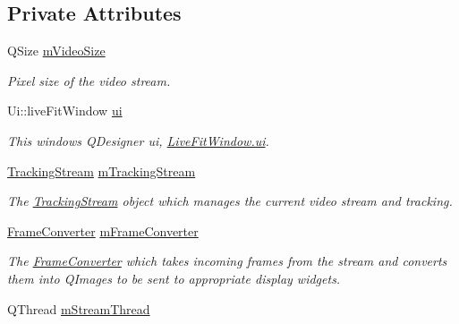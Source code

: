 \subsection*{Private Attributes}
\begin{DoxyCompactItemize}
\item 
Q\+Size \hyperlink{classLiveFitWindow_aaf25c0704549526c5312c29eb5db3feb}{m\+Video\+Size}\hypertarget{classLiveFitWindow_aaf25c0704549526c5312c29eb5db3feb}{}\label{classLiveFitWindow_aaf25c0704549526c5312c29eb5db3feb}

\begin{DoxyCompactList}\small\item\em Pixel size of the video stream. \end{DoxyCompactList}\item 
Ui\+::live\+Fit\+Window \hyperlink{classLiveFitWindow_a5e598fb19c7a2e513750052330843afc}{ui}\hypertarget{classLiveFitWindow_a5e598fb19c7a2e513750052330843afc}{}\label{classLiveFitWindow_a5e598fb19c7a2e513750052330843afc}

\begin{DoxyCompactList}\small\item\em This window\textquotesingle{}s Q\+Designer ui, \hyperlink{classLiveFitWindow_a5e598fb19c7a2e513750052330843afc}{Live\+Fit\+Window.\+ui}. \end{DoxyCompactList}\item 
\hyperlink{classTrackingStream}{Tracking\+Stream} \hyperlink{classLiveFitWindow_ab5bb92518073cbe806879092e322f165}{m\+Tracking\+Stream}\hypertarget{classLiveFitWindow_ab5bb92518073cbe806879092e322f165}{}\label{classLiveFitWindow_ab5bb92518073cbe806879092e322f165}

\begin{DoxyCompactList}\small\item\em The \hyperlink{classTrackingStream}{Tracking\+Stream} object which manages the current video stream and tracking. \end{DoxyCompactList}\item 
\hyperlink{classFrameConverter}{Frame\+Converter} \hyperlink{classLiveFitWindow_aaeb5e21241e7ff1c4cb842cf5910b8c6}{m\+Frame\+Converter}\hypertarget{classLiveFitWindow_aaeb5e21241e7ff1c4cb842cf5910b8c6}{}\label{classLiveFitWindow_aaeb5e21241e7ff1c4cb842cf5910b8c6}

\begin{DoxyCompactList}\small\item\em The \hyperlink{classFrameConverter}{Frame\+Converter} which takes incoming frames from the stream and converts them into Q\+Images to be sent to appropriate display widgets. \end{DoxyCompactList}\item 
Q\+Thread \hyperlink{classLiveFitWindow_ac9db28411775756d862564a1ec442d88}{m\+Stream\+Thread}\hypertarget{classLiveFitWindow_ac9db28411775756d862564a1ec442d88}{}\label{classLiveFitWindow_ac9db28411775756d862564a1ec442d88}


\end{DoxyCompactItemize}
